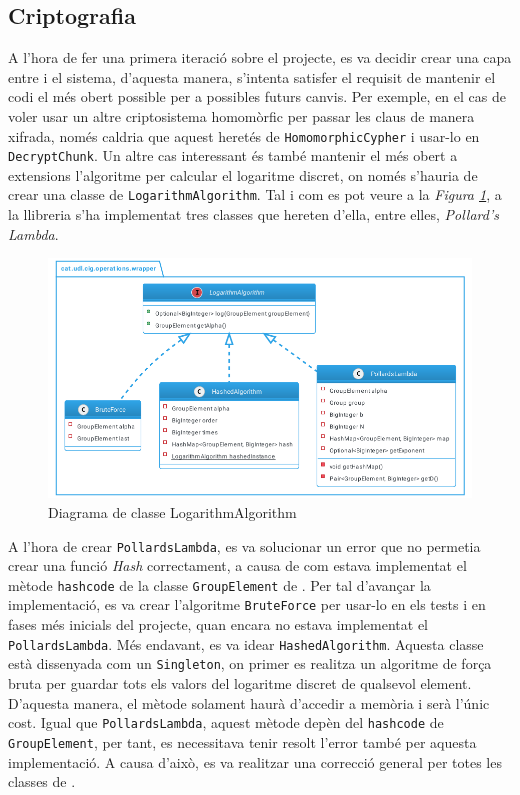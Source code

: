 \subsection{Criptografia}
A l'hora de fer una primera iteració sobre el projecte, es va decidir crear una capa entre \ciglib i el sistema, d'aquesta manera, s'intenta satisfer el requisit de mantenir el codi el més obert possible per a possibles futurs canvis. Per exemple, en el cas de voler usar un altre criptosistema homomòrfic per passar les claus de manera xifrada, només caldria que aquest heretés de \texttt{HomomorphicCypher} i usar-lo en \texttt{DecryptChunk}. Un altre cas interessant és també mantenir el més obert a extensions l'algoritme per calcular el logaritme discret, on només s'hauria de crear una classe de \texttt{LogarithmAlgorithm}. Tal i com es pot veure a la \textit{Figura \ref{fig:logarithm}}, a la llibreria \cite{ciglib} s'ha implementat tres classes que hereten d'ella, entre elles, \textit{Pollard's Lambda}.
\begin{figure}[H]
	\centering
	\includegraphics[width=15cm]{classes/log.png}
	\caption{Diagrama de classe LogarithmAlgorithm}
	\label{fig:logarithm}
\end{figure}
A l'hora de crear \texttt{PollardsLambda}, es va solucionar un error que no permetia crear una funció \textit{Hash} correctament, a causa de com estava implementat el mètode \texttt{hashcode} de la classe \texttt{GroupElement} de \cite{ciglib}. Per tal d'avançar la implementació, es va crear l'algoritme \texttt{BruteForce} per usar-lo en els tests i en fases més inicials del projecte, quan encara no estava implementat el \texttt{PollardsLambda}. Més endavant, es va idear \texttt{HashedAlgorithm}. Aquesta classe està dissenyada com un \texttt{Singleton}, on primer es realitza un algoritme de força bruta per guardar tots els valors del logaritme discret de qualsevol element. D'aquesta manera, el mètode solament haurà d'accedir a memòria i serà l'únic cost. Igual que \texttt{PollardsLambda}, aquest mètode depèn del \texttt{hashcode} de \texttt{GroupElement}, per tant, es necessitava tenir resolt l'error també per aquesta implementació. A causa d'això, es va realitzar una correcció general per totes les classes de \cite{ciglib}.
